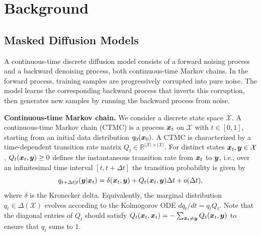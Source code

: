 \section{Background}\label{sec:prelim}
\subsection{Masked Diffusion Models}
A continuous-time discrete diffusion model consists of a forward noising process and a backward denoising process, both continuous-time Markov chains. In the forward process, training samples are progressively corrupted into pure noise. The model learns the corresponding backward process that inverts this corruption, then generates new samples by running the backward process from noise.

\textbf{Continuous-time Markov chain.} We consider a discrete state space $\mathcal{X}$. A continuous-time Markov chain (CTMC) is a process ${\bm{x}}_t$ on $\mathcal X$ with ${t \in [0, 1]}$, starting from an initial data distribution $q_0({\bm{x}}_0)$. A CTMC is characterized by a time-dependent transition rate matrix $Q_t \in \mathbb{R}^{|\mathcal{X}| \times |\mathcal{X}|}$. For distinct states ${\bm{x}}_t, {\bm{y}} \in \mathcal{X}$, $Q_t({\bm{x}}_t, {\bm{y}}) \ge 0$ defines the instantaneous transition rate from ${\bm{x}}_t$ to ${\bm{y}}$, i.e., over an infinitesimal time interval $[t,t+\Delta t]$ the transition probability is given by
\begin{equation}\label{eq:infinitesimal_transition}
    q_{t+\Delta t|t}({\bm{y}}|{\bm{x}}_t) = \delta({\bm{x}}_t, {\bm{y}}) + Q_t({\bm{x}}_t, {\bm{y}}) \Delta t + o(\Delta t),
\end{equation}
where $\delta$ is the Kronecker delta.
Equivalently, the marginal distribution $q_t\in\Delta(\mathcal X)$ evolves according to the Kolmogorov ODE $dq_t/dt = q_t Q_t$.
Note that the diagonal entries of $Q_t$ should satisfy $Q_t({\bm{x}}_t, {\bm{x}}_t) = - \sum_{{\bm{x}}_t \neq {\bm{y}}} Q_t({\bm{x}}_t, {\bm{y}})$ to ensure that $q_t$ sums to $1$. 

